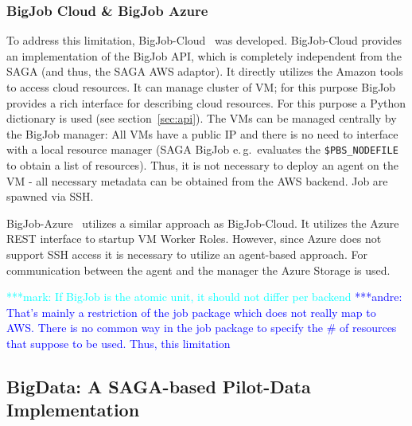 \documentclass[conference,final]{IEEEtran}
\newcommand{\jhanote}[1]{ {\textcolor{red} { ***shantenu: #1 }}}
\newcommand{\alnote}[1]{ {\textcolor{blue} { ***andre: #1 }}}
\newcommand{\msnote}[1]{ {\textcolor{cyan} { ***mark: #1 }}}
\newcommand{\alnote}[1]{}
\newcommand{\jhanote}[1]{}
\newcommand{\msnote}[1]{}
\begin{document}
\subsubsection{BigJob Cloud \& BigJob Azure}

To address this limitation, BigJob-Cloud~\cite{saga_bigjob_condor_cloud} was
developed. BigJob-Cloud provides an implementation of the BigJob API, which is
completely independent from the SAGA (and thus, the SAGA AWS adaptor). It
directly utilizes the Amazon tools to access cloud resources. It can manage
cluster of VM; for this purpose BigJob provides a rich interface for describing
cloud resources. For this purpose a Python dictionary is used (see
section~\ref{sec:api}). The VMs can be managed centrally by the BigJob manager:
All VMs have a public IP and there is no need to interface with a local resource
manager (SAGA BigJob e.\,g.\ evaluates the \texttt{\$PBS\_NODEFILE} to obtain a
list of resources). Thus, it is not necessary to deploy an agent on the VM - all
necessary metadata can be obtained from the AWS backend. Job are spawned via
SSH.



BigJob-Azure~\cite{10.1109/CloudCom.2010.85} utilizes a similar approach as
BigJob-Cloud. It utilizes the Azure REST interface to startup VM Worker Roles.
However, since Azure does not support SSH access it is necessary to utilize an
agent-based approach. For communication between the agent and the manager the
Azure Storage is used.

\msnote{If BigJob is the atomic unit, it should not differ per
  backend}\alnote{That's mainly a restriction of the job package which
  does not really map to AWS. There is no common way in the job
  package to specify the \# of resources that suppose to be
  used. Thus, this limitation}


\subsection{BigData: A SAGA-based Pilot-Data Implementation}
\label{sec:bigdata}
\end{document}
